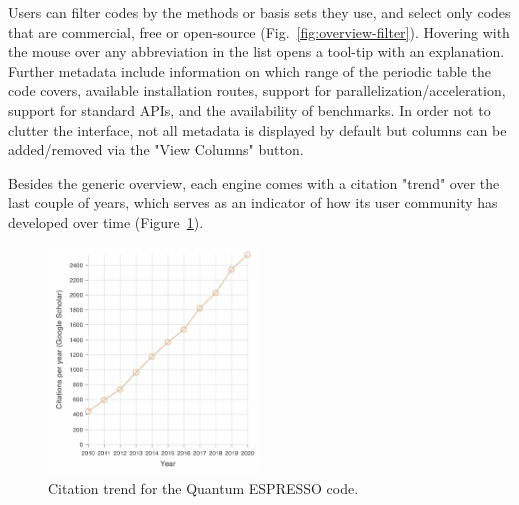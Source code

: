 \documentclass[9pt,review]{livecoms}
\begin{document}
Users can filter codes by the methods or basis sets they use, and select only codes that are commercial, free or open-source (Fig.~\ref{fig:overview-filter}). 
Hovering with the mouse over any abbreviation in the list opens a tool-tip with an explanation.
Further metadata include information on which range of the periodic table the code covers, 
available installation routes, 
support for parallelization/acceleration,
support for standard APIs,
and the  availability of benchmarks.
In order not to clutter the interface, not all metadata is displayed by default but columns can be added/removed via the "View Columns" button.

Besides the generic overview, each engine comes with a citation "trend" over the last couple of years, which serves as an indicator of how its user community has developed over time (Figure~\ref{fig:quantum-espresso}).



\begin{figure}
    \includegraphics[width=0.5\textwidth]{figures/quantum-espresso}
    \caption{
        Citation trend for the Quantum ESPRESSO code.
    }
    \label{fig:quantum-espresso}
\end{figure}
\end{document}
